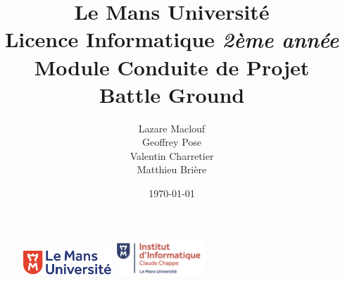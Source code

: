 \documentclass[a4paper,11pt]{article}
\begin{document}
\begin {figure}
\includegraphics[width=0.3\textwidth]{logolemansU.png}
\hspace{150pt} 
\includegraphics[width=0.3\textwidth] {logo_ic2.png}
\end {figure}
\title {\textbf {\color {blue} Le Mans Université}\color{black}
\\  Licence Informatique  \textit {2ème année}
 \\Module Conduite de Projet
 \\ \textbf {Battle Ground }}
\author{Lazare Maclouf\\
Geoffrey Pose\\Valentin Charretier\\
Matthieu Brière}
\\
\date{\today} 
\maketitle 
\newpage
\tableofcontents
\newpage
\end{document}
